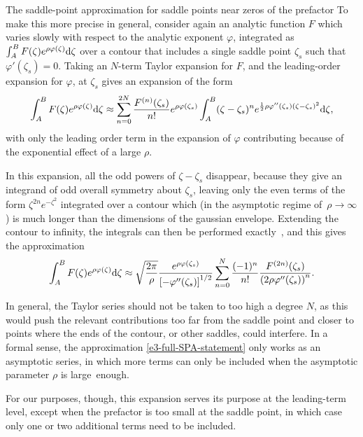\begin{mathaside}{The saddle-point approximation for saddle points near zeros of the prefactor}
\label{aside.SPAreprise}
\noindent
To make this more precise in general, consider again  an analytic function $F$ which varies slowly with respect to the analytic exponent $\varphi$, integrated as $\int_A^B F(\zeta) e^{\rho \varphi(\zeta)}\mathrm{d}\zeta$ over a contour that includes a single saddle point $\zeta_s$ such that $\varphi'(\zeta_s)=0$. Taking an $N$-term Taylor expansion for $F$, and the leading-order expansion for $\varphi$, at $\zeta_s$ gives an expansion of the form
\begin{equation}
\int_A^B F(\zeta) e^{\rho \varphi(\zeta)}\mathrm{d}\zeta
\approx
\sum_{n=0}^{2N}\frac{F^{(n)}(\zeta_s)}{n!}  e^{\rho \varphi(\zeta_s)}\int_A^B (\zeta-\zeta_s)^n  e^{\frac12 \rho \varphi ''(\zeta_s)(\zeta-\zeta_s)^2} \mathrm{d}\zeta
,
\end{equation}
with only the leading order term in the expansion of $\varphi$ contributing because of the exponential effect of a large $\rho$.

\vspace{\maskip}
In this expansion, all the odd powers of $\zeta-\zeta_s$ disappear, because they give an integrand of odd overall symmetry about $\zeta_s$, leaving only the even terms of the form $\zeta^{2n}e^{-\zeta^2}$ integrated over a contour which (in the asymptotic regime of~$\rho\to\infty$) is much longer than the dimensions of the gaussian envelope. Extending the contour to infinity, the integrals can then be performed exactly~\cite{BruijnAsymptotics, GerlachSPAonline}, and this gives the approximation
\begin{equation}
\int_A^B F(\zeta) e^{\rho \varphi(\zeta)}\mathrm{d}\zeta
\approx
\sqrt{\frac{2\pi}{\rho}} 
\frac{e^{\rho\varphi(\zeta_s)}}{\left[-\varphi''(\zeta_s)\right]^{1/2}}
\sum_{n=0}^N
\frac{(-1)^n}{n!}
\frac{
  F^{(2n)}(\zeta_s) 
  }{
  \left(2\rho\varphi''(\zeta_s)\right)^n
  }
.
\label{e3-full-SPA-statement}
\end{equation}

In general, the Taylor series should not be taken to too high a degree $N$, as this would push the relevant contributions too far from the saddle point and closer to points where the ends of the contour, or other saddles, could interfere. In a formal sense, the approximation \eqref{e3-full-SPA-statement} only works as an asymptotic series, in which more terms can only be included when the asymptotic parameter $\rho$ is large~enough. 

For our purposes, though, this expansion serves its purpose at the leading-term level, except when the prefactor is too small at the saddle point, in which case only one or two additional terms need to be included.
\end{mathaside}


